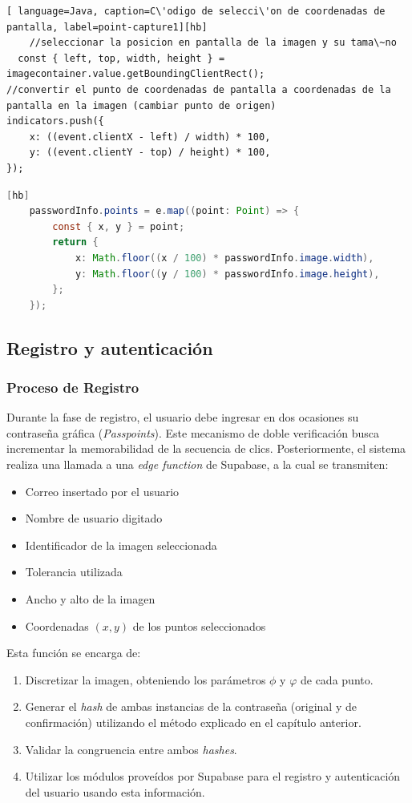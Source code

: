 \begin{lstlisting}[ language=Java, caption=C\'odigo de selecci\'on de coordenadas de pantalla, label=point-capture1][hb]
	//seleccionar la posicion en pantalla de la imagen y su tama\~no
  const { left, top, width, height } =
imagecontainer.value.getBoundingClientRect();
//convertir el punto de coordenadas de pantalla a coordenadas de la pantalla en la imagen (cambiar punto de origen)
indicators.push({
	x: ((event.clientX - left) / width) * 100,
	y: ((event.clientY - top) / height) * 100,
});

\end{lstlisting}


\begin{lstlisting}[style=mystyle, language=Java, caption=C\'odigo de transformaci\'on en coordenadas de imagen, label=point-capture2][hb]
	passwordInfo.points = e.map((point: Point) => {
		const { x, y } = point;
		return {
			x: Math.floor((x / 100) * passwordInfo.image.width),
			y: Math.floor((y / 100) * passwordInfo.image.height),
		};
	});
\end{lstlisting}

\subsection{Registro y autenticaci\'on}
\subsubsection{Proceso de Registro}
Durante la fase de registro, el usuario debe ingresar en dos ocasiones su contraseña gráfica (\textit{Passpoints}). Este mecanismo de doble verificación busca incrementar la memorabilidad de la secuencia de clics. Posteriormente, el sistema realiza una llamada a una \textit{edge function} de Supabase, a la cual se transmiten:

\begin{itemize}
	\item Correo insertado por el usuario
	\item Nombre de usuario digitado
	\item Identificador de la imagen seleccionada
	\item Tolerancia utilizada 
	\item Ancho y alto de la imagen
	\item Coordenadas $(x,y)$ de los puntos seleccionados
\end{itemize}

Esta función se encarga de: 
\begin{enumerate}
	\item Discretizar la imagen, obteniendo los parámetros $\phi$  y $\varphi$ de cada punto.
	\item Generar el \textit{hash} de ambas instancias de la contraseña (original y de confirmación) utilizando el m\'etodo explicado en el cap\'itulo anterior.
	\item Validar la congruencia entre ambos \textit{hashes}.
	\item Utilizar los m\'odulos prove\'idos por Supabase para el registro y autenticaci\'on del usuario usando esta informaci\'on.
\end{enumerate}

